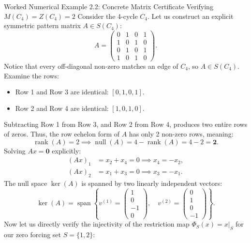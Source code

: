 \documentclass[11pt]{article}
\begin{document}
\begin{callbox}{Worked Numerical Example 2.2: Concrete Matrix Certificate Verifying $M(C_4) = Z(C_4) = 2$}
Consider the 4-cycle $C_4$. Let us construct an explicit symmetric pattern matrix $A \in S(C_4)$:
\begin{equation}
  A = \begin{pmatrix}
    0 & 1 & 0 & 1 \\
    1 & 0 & 1 & 0 \\
    0 & 1 & 0 & 1 \\
    1 & 0 & 1 & 0
  \end{pmatrix}.
\end{equation}
Notice that every off-diagonal non-zero matches an edge of $C_4$, so $A \in S(C_4)$.
Examine the rows:
\begin{itemize}[leftmargin=*,nosep]
  \item Row 1 and Row 3 are identical: $[0, 1, 0, 1]$.
  \item Row 2 and Row 4 are identical: $[1, 0, 1, 0]$.
\end{itemize}
Subtracting Row 1 from Row 3, and Row 2 from Row 4, produces two entire rows of zeros.
Thus, the row echelon form of $A$ has only 2 non-zero rows, meaning:
\begin{equation}
  \operatorname{rank}(A) = 2 \implies \operatorname{null}(A) = 4 - \operatorname{rank}(A) = 4 - 2 = \mathbf{2}.
\end{equation}
Solving $Ax = \mathbf{0}$ explicitly:
\begin{align}
  (Ax)_1 &= x_2 + x_4 = 0 \implies x_4 = -x_2, \\
  (Ax)_2 &= x_1 + x_3 = 0 \implies x_3 = -x_1.
\end{align}
The null space $\ker(A)$ is spanned by two linearly independent vectors:
\begin{equation}
  \ker(A) = \operatorname{span}\left\{
    v^{(1)} = \begin{pmatrix} 1 \\ 0 \\ -1 \\ 0 \end{pmatrix}, \quad
    v^{(2)} = \begin{pmatrix} 0 \\ 1 \\ 0 \\ -1 \end{pmatrix}
  \right\}.
\end{equation}
Now let us directly verify the injectivity of the restriction map $\Phi_S(x) = x|_S$ for our zero forcing set $S = \{1, 2\}$:

\end{callbox}
\end{document}
